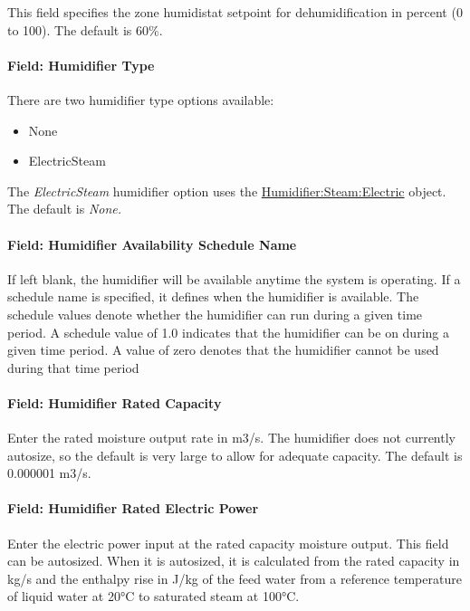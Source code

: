 This field specifies the zone humidistat setpoint for dehumidification in percent (0 to 100). The default is 60\%.

\paragraph{Field: Humidifier Type}\label{field-humidifier-type}

There are two humidifier type options available:

\begin{itemize}
\item
  None
\item
  ElectricSteam
\end{itemize}

The \emph{ElectricSteam} humidifier option uses the \hyperref[humidifiersteamelectric]{Humidifier:Steam:Electric} object. The default is \emph{None.}

\paragraph{Field: Humidifier Availability Schedule Name}\label{field-humidifier-availability-schedule-name}

If left blank, the humidifier will be available anytime the system is operating. If a schedule name is specified, it defines when the humidifier is available. The schedule values denote whether the humidifier can run during a given time period. A schedule value of 1.0 indicates that the humidifier can be on during a given time period. A value of zero denotes that the humidifier cannot be used during that time period

\paragraph{Field: Humidifier Rated Capacity}\label{field-humidifier-rated-capacity}

Enter the rated moisture output rate in m3/s. The humidifier does not currently autosize, so the default is very large to allow for adequate capacity. The default is 0.000001 m3/s.

\paragraph{Field: Humidifier Rated Electric Power}\label{field-humidifier-rated-electric-power}

Enter the electric power input at the rated capacity moisture output. This field can be autosized. When it is autosized, it is calculated from the rated capacity in kg/s and the enthalpy rise in J/kg of the feed water from a reference temperature of liquid water at 20°C to saturated steam at 100°C.

